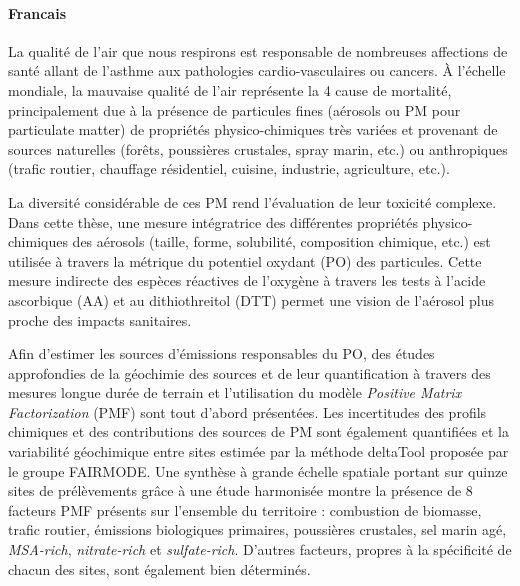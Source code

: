 
\paragraph{Francais}%
\label{par:francais}

La qualité de l'air que nous respirons est responsable de nombreuses affections de santé allant de
l'asthme aux pathologies cardio-vasculaires ou cancers. À l'échelle mondiale, la mauvaise
qualité de l'air représente la
4\ieme{} cause de mortalité, principalement due à la
présence de particules fines (aérosols ou PM pour particulate matter) de propriétés physico-chimiques très
variées et
provenant de sources naturelles (forêts, poussières crustales, spray marin, etc.) ou
anthropiques (trafic routier, chauffage résidentiel, cuisine, industrie, agriculture,
etc.).

La diversité considérable de ces PM rend l'évaluation de leur toxicité complexe. Dans
cette thèse, 
une mesure intégratrice des différentes propriétés physico-chimiques des
aérosols (taille, forme, solubilité, composition chimique, etc.) est utilisée à travers la
métrique du potentiel oxydant (PO) des particules.
Cette mesure indirecte des espèces réactives de l'oxygène à travers les tests à l'acide
ascorbique (AA) et au dithiothreitol (DTT) permet une vision de l'aérosol plus proche des
impacts sanitaires.

Afin d'estimer les sources d'émissions responsables du PO, des études approfondies de la
géochimie des sources et de leur quantification à travers des mesures longue durée de
terrain et l'utilisation du modèle \textit{Positive Matrix Factorization} (PMF) sont tout
d'abord présentées. Les incertitudes des profils chimiques et des contributions
des sources de PM sont également quantifiées et la variabilité géochimique entre sites
estimée par la méthode deltaTool proposée par le groupe FAIRMODE. Une synthèse à grande
échelle spatiale portant sur quinze sites de prélèvements grâce à une étude harmonisée
montre la présence de 8 facteurs PMF présents sur l'ensemble du territoire : combustion de
biomasse, trafic routier, émissions biologiques primaires, poussières crustales, sel marin
agé, \textit{MSA-rich}, \textit{nitrate-rich} et \textit{sulfate-rich}. D'autres facteurs,
propres à la spécificité de chacun des sites, sont également bien déterminés.

